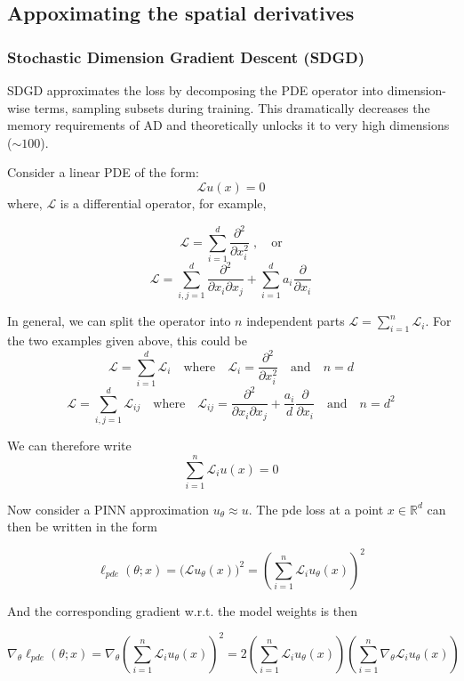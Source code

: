 \subsection{Appoximating the spatial derivatives}

\subsubsection{Stochastic Dimension Gradient Descent (SDGD)}

SDGD approximates the loss by decomposing the PDE operator into dimension-wise terms, sampling subsets during training.
This dramatically decreases the memory requirements of AD and theoretically unlocks it to very high dimensions ($\sim 100$).

Consider a linear PDE of the form:
$$
\mathcal{L}u(x) = 0
$$
where, $\mathcal{L}$ is a differential operator, for example,

$$
\mathcal{L} = \sum_{i=1}^d\frac{\partial^2}{\partial x_i^2}\;,\quad\text{or}
$$
$$
\mathcal{L} = \sum_{i,j=1}^d\frac{\partial^2}{\partial x_i \partial x_j} + \sum_{i=1}^d a_i\frac{\partial}{\partial x_i}
$$

In general, we can split the operator into $n$ independent parts $\mathcal{L} = \sum_{i=1}^n\mathcal{L}_i$.
For the two examples given above, this could be
$$
\mathcal{L} = \sum_{i=1}^d \mathcal{L}_i
\quad \text{where}\quad
\mathcal{L}_i = \frac{\partial^2}{\partial x_i^2}
\quad \text{and} \quad n=d
$$
$$
\mathcal{L} = \sum_{i,j=1}^d \mathcal{L}_{ij}
\quad \text{where}\quad
\mathcal{L}_{ij} = \frac{\partial^2}{\partial x_i\partial x_j} + \frac{a_i}{d} \frac{\partial}{\partial x_i}
\quad \text{and} \quad n=d^2
$$

We can therefore write
$$
\sum_{i=1}^n\mathcal{L}_i u(x) = 0
$$

Now consider a PINN approximation $u_\theta \approx u$. 
The pde loss at a point $x\in\mathbb{R}^d$ can then be written in the form

$$
\ell_{pde}(\theta;x)
= \big( \mathcal{L} u_\theta(x) \big)^2
= \left( \sum_{i=1}^n \mathcal{L}_i u_\theta(x) \right)^2
$$

And the corresponding gradient w.r.t. the model weights is then

$$
\nabla_\theta \ell_{pde}(\theta;x) = \nabla_\theta \left( \sum_{i=1}^n \mathcal{L}_i u_\theta(x) \right)^2
= 2 \left( \sum_{i=1}^n \mathcal{L}_i u_\theta(x) \right) \left( \sum_{i=1}^n \nabla_\theta \mathcal{L}_i u_\theta(x) \right)
$$

